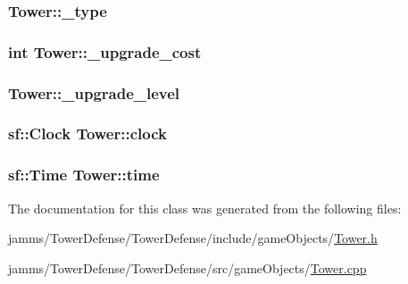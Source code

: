\hypertarget{class_tower_adebb7de2d38284d29e3ca6b37c4a2be9}{
\subsubsection[{\+\_\+type}]{ Tower\+::\+\_\+type\hspace{0.3cm}{\ttfamily [protected]}}}\label{class_tower_adebb7de2d38284d29e3ca6b37c4a2be9}
\hypertarget{class_tower_ade771f89ab1aecb165efb74592e71261}{
\subsubsection[{\+\_\+upgrade\+\_\+cost}]{\setlength{\rightskip}{0pt plus 5cm}int Tower\+::\+\_\+upgrade\+\_\+cost\hspace{0.3cm}{\ttfamily [protected]}}}\label{class_tower_ade771f89ab1aecb165efb74592e71261}
\hypertarget{class_tower_a0172731487da6a0480901e031e2aecbe}{
\subsubsection[{\+\_\+upgrade\+\_\+level}]{ Tower\+::\+\_\+upgrade\+\_\+level\hspace{0.3cm}{\ttfamily [protected]}}}\label{class_tower_a0172731487da6a0480901e031e2aecbe}
\hypertarget{class_tower_a3b6e91ecba4f6dadb4e5ed3514f970e9}{
\subsubsection[{clock}]{\setlength{\rightskip}{0pt plus 5cm}sf\+::\+Clock Tower\+::clock\hspace{0.3cm}{\ttfamily [private]}}}\label{class_tower_a3b6e91ecba4f6dadb4e5ed3514f970e9}
\hypertarget{class_tower_a2536099ae99cd22eef6d84259dab5ed7}{
\subsubsection[{time}]{\setlength{\rightskip}{0pt plus 5cm}sf\+::\+Time Tower\+::time\hspace{0.3cm}{\ttfamily [private]}}}\label{class_tower_a2536099ae99cd22eef6d84259dab5ed7}


The documentation for this class was generated from the following files\+:\begin{DoxyCompactItemize}
\item 
jamms/\+Tower\+Defense/\+Tower\+Defense/include/game\+Objects/\hyperlink{_tower_8h}{Tower.\+h}\item 
jamms/\+Tower\+Defense/\+Tower\+Defense/src/game\+Objects/\hyperlink{_tower_8cpp}{Tower.\+cpp}\end{DoxyCompactItemize}

